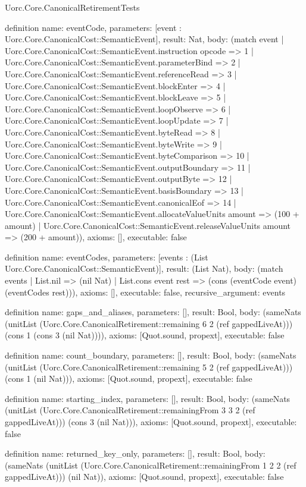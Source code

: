 \begin{lexlean}{Uorc.Core.CanonicalRetirementTests}
\begin{semanticmodule}
definition{
  name: eventCode,
  parameters: [event : Uorc.Core.CanonicalCost::SemanticEvent],
  result: Nat,
  body: (match event
    | Uorc.Core.CanonicalCost::SemanticEvent.instruction opcode => 1
    | Uorc.Core.CanonicalCost::SemanticEvent.parameterBind => 2
    | Uorc.Core.CanonicalCost::SemanticEvent.referenceRead => 3
    | Uorc.Core.CanonicalCost::SemanticEvent.blockEnter => 4
    | Uorc.Core.CanonicalCost::SemanticEvent.blockLeave => 5
    | Uorc.Core.CanonicalCost::SemanticEvent.loopObserve => 6
    | Uorc.Core.CanonicalCost::SemanticEvent.loopUpdate => 7
    | Uorc.Core.CanonicalCost::SemanticEvent.byteRead => 8
    | Uorc.Core.CanonicalCost::SemanticEvent.byteWrite => 9
    | Uorc.Core.CanonicalCost::SemanticEvent.byteComparison => 10
    | Uorc.Core.CanonicalCost::SemanticEvent.outputBoundary => 11
    | Uorc.Core.CanonicalCost::SemanticEvent.outputByte => 12
    | Uorc.Core.CanonicalCost::SemanticEvent.basisBoundary => 13
    | Uorc.Core.CanonicalCost::SemanticEvent.canonicalEof => 14
    | Uorc.Core.CanonicalCost::SemanticEvent.allocateValueUnits amount => (100 + amount)
    | Uorc.Core.CanonicalCost::SemanticEvent.releaseValueUnits amount => (200 + amount)),
  axioms: [],
  executable: false
}

definition{
  name: eventCodes,
  parameters: [events : (List Uorc.Core.CanonicalCost::SemanticEvent)],
  result: (List Nat),
  body: (match events
    | List.nil => (nil Nat)
    | List.cons event rest => (cons (eventCode event) (eventCodes rest))),
  axioms: [],
  executable: false,
  recursive_argument: events
}

definition{
  name: gaps_and_aliases,
  parameters: [],
  result: Bool,
  body: (sameNats (unitList (Uorc.Core.CanonicalRetirement::remaining 6 2 (ref gappedLiveAt))) (cons 1 (cons 3 (nil Nat)))),
  axioms: [Quot.sound, propext],
  executable: false
}

definition{
  name: count_boundary,
  parameters: [],
  result: Bool,
  body: (sameNats (unitList (Uorc.Core.CanonicalRetirement::remaining 5 2 (ref gappedLiveAt))) (cons 1 (nil Nat))),
  axioms: [Quot.sound, propext],
  executable: false
}

definition{
  name: starting_index,
  parameters: [],
  result: Bool,
  body: (sameNats (unitList (Uorc.Core.CanonicalRetirement::remainingFrom 3 3 2 (ref gappedLiveAt))) (cons 3 (nil Nat))),
  axioms: [Quot.sound, propext],
  executable: false
}

definition{
  name: returned_key_only,
  parameters: [],
  result: Bool,
  body: (sameNats (unitList (Uorc.Core.CanonicalRetirement::remainingFrom 1 2 2 (ref gappedLiveAt))) (nil Nat)),
  axioms: [Quot.sound, propext],
  executable: false
}


\end{semanticmodule}
\end{lexlean}
